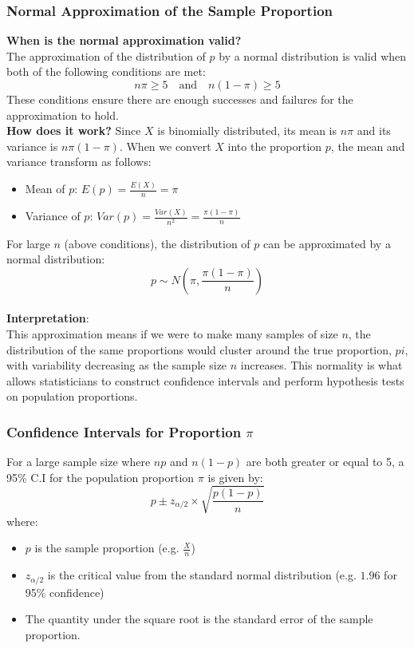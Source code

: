 \documentclass[10pt]{extarticle}
\begin{document}
\subsubsection{Normal Approximation of the Sample Proportion}
\textbf{When is the normal approximation valid?}\\
The approximation of the distribution of $p$ by a normal distribution is valid when both of the following conditions are met:   
$$n\pi \geq 5 \quad \text{and} \quad n(1 - \pi) \geq 5$$
These conditions ensure there are enough successes and failures for the approximation to hold. \\[2ex]
\textbf{How does it work?}
Since $X$ is binomially distributed, its mean is $n\pi$ and its variance is $n\pi(1 - \pi)$. When we convert $X$ into the proportion $p$, the mean and variance transform as follows:
\begin{itemize}
    \item Mean of $p$: $E(p) = \frac{E(X)}{n} = \pi$
    \item Variance of $p$: $Var(p) = \frac{Var(X)}{n^2} = \frac{\pi(1 - \pi)}{n}$
\end{itemize}
For large $n$ (above conditions), the distribution of $p$ can be approximated by a normal distribution:
$$p \sim N\left(\pi, \frac{\pi(1 - \pi)}{n}\right)$$\\
\textbf{Interpretation}: \\
This approximation means if we were to make many samples of size $n$, the distribution of the same proportions would cluster around the true proportion, $pi$, with variability decreasing as the sample size $n$ increases. This normality is what allows statisticians to construct confidence intervals and perform hypothesis tests on population proportions.
\subsubsection{Confidence Intervals for Proportion $\pi$}
For a large sample size where $np$ and $n(1-p)$ are both greater or equal to 5, a 95\% C.I for the population proportion $\pi$ is given by:
$$p \pm z_{\alpha/2} \times \sqrt{\frac{p(1 - p)}{n}}$$
where:
\begin{itemize}
    \item $p$ is the sample proportion (e.g. $\frac{X}{n}$)
    \item $z_{\alpha/2}$ is the critical value from the standard normal distribution (e.g. $1.96$ for 95\% confidence)
    \item The quantity under the square root is the standard error of the sample proportion.
\end{itemize}
\end{document}
